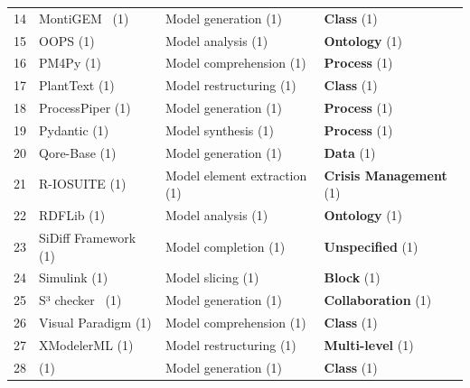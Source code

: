 \begin{tabular} { p{} p{} p{} p{} }
\rowcolor{gray!15} 
14& MontiGEM~\cite{adam2020enterprise} (1) & \cellcolor[HTML]{D1F1E3}Model generation (1) & \textbf{Class} (1) \cite{ \paperfiftieth }\\ 
15& OOPS (1) & \cellcolor[HTML]{F2E9D4}Model analysis (1) & \textbf{Ontology} (1) \cite{ \papertwohundredfortyseventh }\\ 
\rowcolor{gray!15} 
16& PM4Py (1) & \cellcolor[HTML]{E4EDD4}Model comprehension (1) & \textbf{Process} (1) \cite{ \paperonehundredfortyfourth }\\ 
17& PlantText (1) & \cellcolor[HTML]{E3E9FE}Model restructuring (1) & \textbf{Class} (1) \cite{ \papertwohundredtwentyfifth }\\ 
\rowcolor{gray!15} 
18& ProcessPiper (1) & \cellcolor[HTML]{D1F1E3}Model generation (1) & \textbf{Process} (1) \cite{ \papereightyfirst }\\ 
19& Pydantic (1) & \cellcolor[HTML]{F3E4FC}Model synthesis (1) & \textbf{Process} (1) \cite{ \paperthirtieth }\\ 
\rowcolor{gray!15} 
20& Qore-Base (1) & \cellcolor[HTML]{D1F1E3}Model generation (1) & \textbf{Data} (1) \cite{ \paperonehundredseventeenth }\\ 
21& R-IOSUITE (1) & \cellcolor[HTML]{D6F0DD}Model element extraction (1) & \textbf{Crisis Management} (1) \cite{ \papereightyeighth }\\ 
\rowcolor{gray!15} 
22& RDFLib (1) & \cellcolor[HTML]{F2E9D4}Model analysis (1) & \textbf{Ontology} (1) \cite{ \papertwohundredfortyseventh }\\ 
23& SiDiff Framework~\cite{schmidt2008constructing} (1) & \cellcolor[HTML]{EBEBD3}Model completion (1) & \textbf{Unspecified} (1) \cite{ \paperonehundredseventyfourth }\\ 
\rowcolor{gray!15} 
24& Simulink (1) & \cellcolor[HTML]{ECE7FD}Model slicing (1) & \textbf{Block} (1) \cite{ \paperseventysixth }\\ 
25& S³ checker~\cite{corradini2020correctness} (1) & \cellcolor[HTML]{D1F1E3}Model generation (1) & \textbf{Collaboration} (1) \cite{ \paperonehundredninetyfourth }\\ 
\rowcolor{gray!15} 
26& Visual Paradigm (1) & \cellcolor[HTML]{E4EDD4}Model comprehension (1) & \textbf{Class} (1) \cite{ \paperseventyninth }\\ 
27& XModelerML (1) & \cellcolor[HTML]{E3E9FE}Model restructuring (1) & \textbf{Multi-level} (1) \cite{ \papertwohundredtwentysixth }\\ 
\rowcolor{gray!15} 
28& \cite{charatan2022python} (1) & \cellcolor[HTML]{D1F1E3}Model generation (1) & \textbf{Class} (1) \cite{ \paperonehundredninetysixth }\\ 

\end{tabular}
